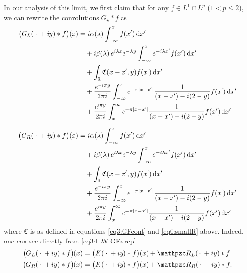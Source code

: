\documentclass[../dissertation.tex]{subfiles}
\begin{document}
In our analysis of this limit, we first claim that for any $f \in L^1 \cap L^p$ 
($1 < p \leq 2$), we can rewrite the convolutions $G_\star*f$ as 
\begin{subequations}
	\label{eq3:ILW.(GFz*f)}
	\begin{align}
		\label{eq3:ILW.(GLz*f)}
		\big(G_L(\kern 0.5ex \cdot \kern 0.5ex + iy)*f\big)(x) 
			&= i\alpha(\lambda) \int_{-\infty}^x f(x') \, \mathrm{d}x' \\
		    &\quad + i\beta(\lambda) \, e^{i\lambda x}e^{-\lambda y} 
		    		\int_{-\infty}^x e^{-i\lambda x'} f(x')\, \mathrm{d}x' 
		    	\nonumber \\
		    &\quad +\int_{\mathbb R} \mathfrak C(x-x',y) f(x') \, \mathrm{d}x' 
				\nonumber \\
			&\quad + \frac{e^{-i \pi y}}{2 \pi i} 
				\int_{-\infty}^x e^{-\pi|x-x'|} \frac{1}{(x-x') - i(2-y)} f(x') \, \mathrm{d}x'
				\nonumber  \\
			&\quad + \frac{e^{i \pi y}}{2 \pi i} 
				\int_x^{\infty} e^{-\pi|x-x'|} \frac{1}{(x-x') - i(2-y)} f(x') \, \mathrm{d}x'
				\nonumber \\[0.5\baselineskip]
		\label{eq3:ILW.(GLz*f)}
		\big(G_R(\kern 0.5ex \cdot \kern 0.5ex + iy)*f\big)(x) 
			&= i\alpha(\lambda) \int_{-\infty}^x f(x') \, \mathrm{d}x' \\
		    &\quad + i\beta(\lambda) \, e^{i\lambda x}e^{-\lambda y} 
		    		\int_{-\infty}^x e^{-i\lambda x'} f(x')\, \mathrm{d}x' 
		    	\nonumber \\
		    &\quad +\int_{\mathbb R} \mathfrak C(x-x',y) f(x') \, \mathrm{d}x' 
				\nonumber \\
			&\quad + \frac{e^{-i \pi y}}{2 \pi i} 
				\int_{-\infty}^x e^{-\pi|x-x'|} \frac{1}{(x-x') - i(2-y)} f(x') \, \mathrm{d}x'
				\nonumber  \\
			&\quad + \frac{e^{i \pi y}}{2 \pi i} 
				\int_x^{\infty} e^{-\pi|x-x'|} \frac{1}{(x-x') - i(2-y)} f(x') \, \mathrm{d}x'
				\nonumber
	\end{align}
\end{subequations}
where $\mathfrak C$ is as defined in equations \eqref{eq3:GFcont} and \eqref{eq0:smallR} above.
Indeed, one can see directly from \eqref{eq3:ILW.GFz.rep} 
\begin{align*}
	\big(G_L(\dotarg + iy)*f\big)(x) 
		&= \big(K(\dotarg + iy) * f\big)(x) + \mathpzc R_L(\dotarg + iy) * f \\
	\big(G_R(\dotarg + iy)*f\big)(x) 
		&= \big(K(\dotarg + iy) * f\big)(x) + \mathpzc R_R(\dotarg + iy) * f.
\end{align*}
\end{document}
